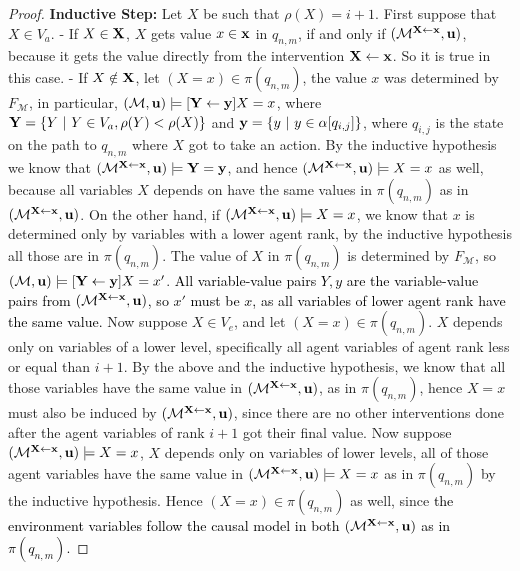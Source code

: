\begin{proof}
    \noindent\textbf{Inductive Step:} Let $X$ be such that $\rho(X) = i +1$. First suppose that $X \in V_a$.\newline
     - If $X \in \mathbf{X}$, $X$ gets value $x \in \mathbf{x}$ in $q_{n,m}$, if and only if $(\mathcal{M}^{\mathbf{X} \leftarrow \mathbf{x}},\mathbf{u})$, because it gets the value directly from the intervention $\mathbf{X} \leftarrow \mathbf{x}$. So it is true in this case.\newline
    - If $X \notin \mathbf{X}$, let $(X = x) \in \pi(q_{n,m})$, the value $x$ was determined by $F_\mathcal{M}$, in particular, $(\mathcal{M},\mathbf{u}) \models [\mathbf{Y} \leftarrow \mathbf{y}] X = x$, where $\mathbf{Y} = \{ {Y \ | \ Y \in V_a, \rho(Y) < \rho(X)} \}$ and $\myvec{y} = \set{y \ | \ y \in \alpha[q_{i,j}]}$, where $q_{i,j}$ is the state on the path to $q_{n,m}$ where $X$ got to take an action. 
    By the inductive hypothesis we know that $(\mathcal{M}^{\mathbf{X} \leftarrow\mathbf{x}},\mathbf{u}) \models \mathbf{Y} = \mathbf{y}$, and hence $(\mathcal{M}^{\mathbf{X} \leftarrow\mathbf{x}},\mathbf{u}) \models X = x$ as well, because all variables $X$ depends on have the same values in $\pi(q_{n,m})$ as in $(\mathcal{M}^{\mathbf{X} \leftarrow \mathbf{x}},\mathbf{u})$.
    On the other hand, if $(\mathcal{M}^{\mathbf{X} \leftarrow \mathbf{x}},\mathbf{u}) \models X = x$, we know that $x$ is determined only by variables with a lower agent rank, by the inductive hypothesis all those are in $\pi(q_{n,m})$. The value of $X$ in $\pi(q_{n,m})$ is determined by $F_\mathcal{M}$, so $(\mathcal{M},\mathbf{u}) \models [\mathbf{Y} \leftarrow \mathbf{y}] X = x'$. 
    \textcolor{black}{All variable-value pairs $Y,y$ are the variable-value pairs from $(\mathcal{M}^{\mathbf{X} \leftarrow \mathbf{x}},\mathbf{u})$, so $x'$ must be $x$, as all variables of lower agent rank have the same value.}\newline
    Now suppose $X \in V_e$, and let $(X = x) \in \pi(q_{n,m})$. $X$ depends only on variables of a lower level, specifically all agent variables of agent rank less or equal than $i + 1$. By the above and the inductive hypothesis, we know that all those variables have the same value in $(\mathcal{M}^{\mathbf{X} \leftarrow \mathbf{x}},\mathbf{u})$, as in $\pi(q_{n,m})$, hence $X = x$ must also be induced by $(\mathcal{M}^{\mathbf{X} \leftarrow \mathbf{x}},\mathbf{u})$, since there are no other interventions done after the agent variables of rank $i+1$ got their final value.
    Now suppose $(\mathcal{M}^{\mathbf{X} \leftarrow \mathbf{x}},\mathbf{u}) \models X = x$, $X$ depends only on variables of lower levels, all of those agent variables have the same value in $(\mathcal{M}^{\mathbf{X} \leftarrow \mathbf{x}},\mathbf{u}) \models X = x$ as in $\pi(q_{n,m})$ by the inductive hypothesis. Hence $(X = x) \in \pi(q_{n,m})$ as well, since \textcolor{black}{the environment variables follow the causal model in both $(\mathcal{M}^{\mathbf{X} \leftarrow \mathbf{x}},\mathbf{u})$ as in $\pi(q_{n,m})$.}
\end{proof}


